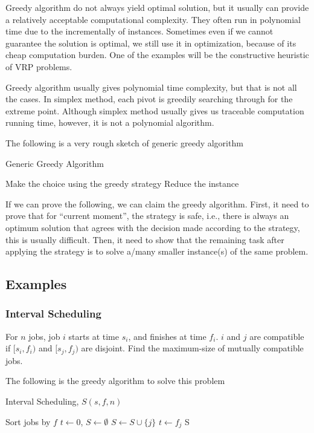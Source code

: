 				Greedy algorithm do not always yield optimal solution, but it usually can provide a relatively acceptable computational complexity. They often run in polynomial time due to the incrementally of instances. Sometimes even if we cannot guarantee the solution is optimal, we still use it in optimization, because of its cheap computation burden. One of the examples will be the constructive heuristic of VRP problems.

				Greedy algorithm usually gives polynomial time complexity, but that is not all the cases. In simplex method, each pivot is greedily searching through for the extreme point. Although simplex method usually gives us traceable computation running time, however, it is not a polynomial algorithm.

				The following is a very rough sketch of generic greedy algorithm
				\begin{algorithm}[!ht]
					\caption{Generic Greedy Algorithm}
					\begin{algorithmic}[1]
							\State Make the choice using the greedy strategy
							\State Reduce the instance
						\EndWhile
					\end{algorithmic}
				\end{algorithm}

				If we can prove the following, we can claim the greedy algorithm. First, it need to prove that for ``current moment'', the strategy is safe, i.e., there is always an optimum solution that agrees with the decision made according to the strategy, this is usually difficult. Then, it need to show that the remaining task after applying the strategy is to solve a/many smaller instance(s) of the same problem.
			\subsection{Examples}
				\subsubsection{Interval Scheduling}
					For $n$ jobs, job $i$ starts at time $s_i$, and finishes at time $f_i$. $i$ and $j$ are compatible if $[s_i, f_i)$ and $[s_j, f_j)$ are disjoint. Find the maximum-size of mutually compatible jobs.

					The following is the greedy algorithm to solve this problem
					\begin{algorithm}[!ht]
						\caption{Interval Scheduling, $S(s, f, n)$}
						\begin{algorithmic}[1]
							\State Sort jobs by $f$
							\State $t \gets 0$, $S\gets \emptyset$
									\State $S \gets S \cup \{j\}$
									\State $t \gets f_j$
								\EndIf
							\EndFor
							\Return S
						\end{algorithmic}
					\end{algorithm}

